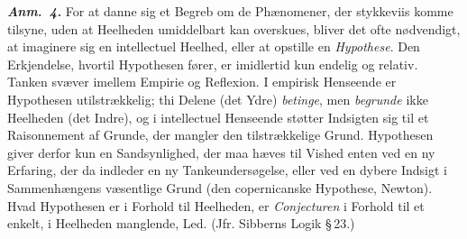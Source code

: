 \documentclass[12pt]{book}
\newcommand{\anm}[1]{\emph{\textbf{Anm.~#1.}}}
\newcommand{\opage}[1]{\marginnote{\footnotesize\textit{[#1]}}}
\begin{document}
\anm{4} For at danne sig et Begreb om de Phænomener, der stykkeviis komme
tilsyne, uden at Heelheden umiddelbart kan overskues, bliver det ofte
nødvendigt, at imaginere sig en intellectuel Heelhed, eller at opstille en
\emph{Hypothese}. Den Erkjendelse, hvortil Hypothesen fører, er imidlertid kun
endelig og relativ. Tanken svæver imellem Empirie og Reflexion. I empirisk
Henseende er Hypothesen utilstrækkelig; thi Delene (det Ydre) \emph{betinge},
men \emph{begrunde} ikke Heelheden (det Indre), og i intellectuel Henseende
støtter Indsigten sig til et Raisonnement af Grunde, der mangler den
tilstrækkelige Grund. Hypothesen giver derfor kun en Sandsynlighed, der maa
hæves til Vished enten ved en ny Erfaring, der da indleder en ny
Tankeundersøgelse, eller ved en dybere Indsigt i Sammenhængens væsentlige
\opage{18} Grund (den copernicanske Hypothese, Newton). Hvad Hypothesen er i Forhold til
Heelheden, er \emph{Conjecturen} i Forhold til et enkelt, i Heelheden
manglende, Led. (Jfr. Sibberns Logik \S\,23.)
\end{document}
